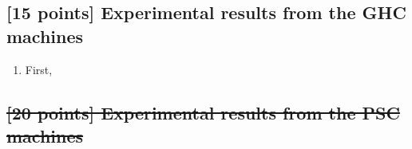 \documentclass[letterpaper,11pt]{exam}
\begin{document}
\begin{questions}
\begin{enumerate}[label=\roman*.]



    \end{enumerate}

    \question
    \subsection*{[15 points] Experimental results from the GHC machines}
    \begin{enumerate}[label=\roman*.]
        \item First,
    \end{enumerate}

    \question
    \subsection*{\sout{[20 points] Experimental results from the PSC machines}}


\end{questions}
\end{document}
